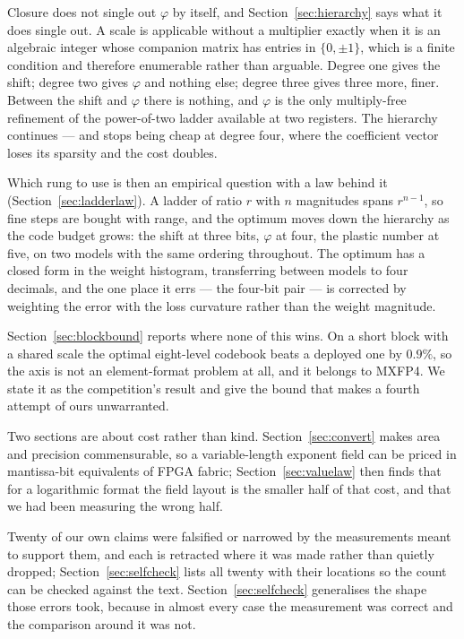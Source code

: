 \documentclass[11pt]{article}
\theoremstyle{definition}
\begin{document}
Closure does not single out $\varphi$ by itself, and Section~\ref{sec:hierarchy}
says what it does single out. A scale is applicable without a multiplier exactly
when it is an algebraic integer whose companion matrix has entries in
$\{0,\pm1\}$, which is a finite condition and therefore enumerable rather than
arguable. Degree one gives the shift; degree two gives $\varphi$ and nothing
else; degree three gives three more, finer. Between the shift and $\varphi$
there is nothing, and $\varphi$ is the only multiply-free refinement of the
power-of-two ladder available at two registers. The hierarchy continues --- and
stops being cheap at degree four, where the coefficient vector loses its
sparsity and the cost doubles.

Which rung to use is then an empirical question with a law behind it
(Section~\ref{sec:ladderlaw}). A ladder of ratio $r$ with $n$ magnitudes spans
$r^{n-1}$, so fine steps are bought with range, and the optimum moves down the
hierarchy as the code budget grows: the shift at three bits, $\varphi$ at four,
the plastic number at five, on two models with the same ordering throughout. The
optimum has a closed form in the weight histogram, transferring between models
to four decimals, and the one place it errs --- the four-bit pair --- is
corrected by weighting the error with the loss curvature rather than the weight
magnitude.

Section~\ref{sec:blockbound} reports where none of this wins. On a short block
with a shared scale the optimal eight-level codebook beats a deployed one by
$0.9\%$, so the axis is not an element-format problem at all, and it belongs to
MXFP4. We state it as the competition's result and give the bound that makes a
fourth attempt of ours unwarranted.

Two sections are about cost rather than kind. Section~\ref{sec:convert} makes
area and precision commensurable, so a variable-length exponent field can be
priced in mantissa-bit equivalents of FPGA fabric; Section~\ref{sec:valuelaw} then finds that
for a logarithmic format the field layout is the smaller half of that cost, and
that we had been measuring the wrong half.

Twenty of our own claims were falsified or narrowed by the measurements meant to
support them, and each is retracted where it was made rather than quietly
dropped; Section~\ref{sec:selfcheck} lists all twenty with their locations so the
count can be checked against the text.
Section~\ref{sec:selfcheck} generalises the shape those errors took, because in
almost every case the measurement was correct and the comparison around it was
not.
\end{document}
